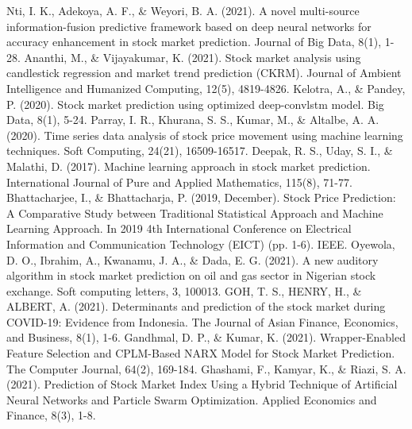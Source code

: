 \documentclass[conference]{IEEEtran}
\begin{document}
\begin{thebibliography}{00}
 Nti, I. K., Adekoya, A. F., \& Weyori, B. A. (2021). A novel multi-source information-fusion predictive framework based on deep neural networks for accuracy enhancement in stock market prediction. Journal of Big Data, 8(1), 1-28.
 Ananthi, M., \& Vijayakumar, K. (2021). Stock market analysis using candlestick regression and market trend prediction (CKRM). Journal of Ambient Intelligence and Humanized Computing, 12(5), 4819-4826.
 Kelotra, A., \& Pandey, P. (2020). Stock market prediction using optimized deep-convlstm model. Big Data, 8(1), 5-24.
 Parray, I. R., Khurana, S. S., Kumar, M., \& Altalbe, A. A. (2020). Time series data analysis of stock price movement using machine learning techniques. Soft Computing, 24(21), 16509-16517.
 Deepak, R. S., Uday, S. I., \& Malathi, D. (2017). Machine learning approach in stock market prediction. International Journal of Pure and Applied Mathematics, 115(8), 71-77. 
 Bhattacharjee, I., \& Bhattacharja, P. (2019, December). Stock Price Prediction: A Comparative Study between Traditional Statistical Approach and Machine Learning Approach. In 2019 4th International Conference on Electrical Information and Communication Technology (EICT) (pp. 1-6). IEEE.
 Oyewola, D. O., Ibrahim, A., Kwanamu, J. A., \& Dada, E. G. (2021). A new auditory algorithm in stock market prediction on oil and gas sector in Nigerian stock exchange. Soft computing letters, 3, 100013.
 GOH, T. S., HENRY, H., \& ALBERT, A. (2021). Determinants and prediction of the stock market during COVID-19: Evidence from Indonesia. The Journal of Asian Finance, Economics, and Business, 8(1), 1-6.
 Gandhmal, D. P., \& Kumar, K. (2021). Wrapper-Enabled Feature Selection and CPLM-Based NARX Model for Stock Market Prediction. The Computer Journal, 64(2), 169-184.
 Ghashami, F., Kamyar, K., \& Riazi, S. A. (2021). Prediction of Stock Market Index Using a Hybrid Technique of Artificial Neural Networks and Particle Swarm Optimization. Applied Economics and Finance, 8(3), 1-8.

\end{thebibliography}
\vspace{12pt}
\end{document}

